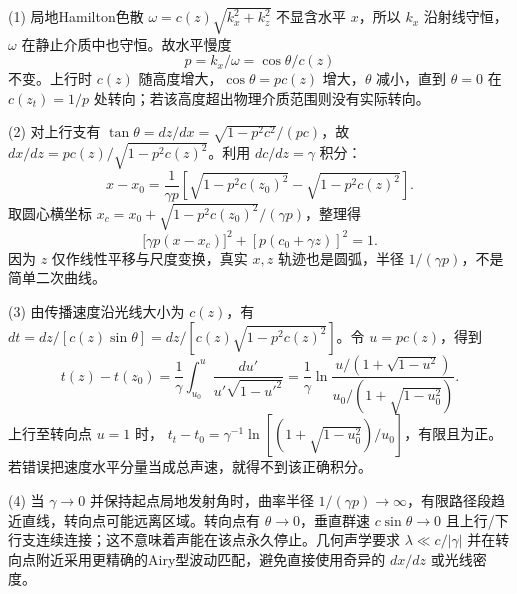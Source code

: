 (1) 局地Hamilton色散 \(\omega=c(z)\sqrt{k_x^2+k_z^2}\) 不显含水平 \(x\)，所以 \(k_x\) 沿射线守恒，\(\omega\) 在静止介质中也守恒。故水平慢度
\[
\boxed{p=k_x/\omega=\cos\theta/c(z)}
\]
不变。上行时 \(c(z)\) 随高度增大，\(\cos\theta=pc(z)\) 增大，\(\theta\) 减小，直到 \(\theta=0\) 在 \(c(z_t)=1/p\) 处转向；若该高度超出物理介质范围则没有实际转向。

(2) 对上行支有 \(\tan\theta=dz/dx=\sqrt{1-p^2c^2}/(pc)\)，故
\(dx/dz=pc(z)/\sqrt{1-p^2c(z)^2}\)。利用 \(dc/dz=\gamma\) 积分：
\[
x-x_0=\frac1{\gamma p}\left[\sqrt{1-p^2c(z_0)^2}-\sqrt{1-p^2c(z)^2}\right].
\]
取圆心横坐标 \(x_c=x_0+\sqrt{1-p^2c(z_0)^2}/(\gamma p)\)，整理得
\[
\boxed{\bigl[\gamma p(x-x_c)\bigr]^2+[p(c_0+\gamma z)]^2=1}.
\]
因为 \(z\) 仅作线性平移与尺度变换，真实 \(x,z\) 轨迹也是圆弧，半径 \(1/(\gamma p)\)，不是简单二次曲线。

(3) 由传播速度沿光线大小为 \(c(z)\)，有 \(dt=dz/[c(z)\sin\theta]=dz/[c(z)\sqrt{1-p^2c(z)^2}]\)。令 \(u=pc(z)\)，得到
\[
t(z)-t(z_0)=\frac1\gamma\int_{u_0}^{u}\frac{du'}{u'\sqrt{1-u'^2}}
=\frac1\gamma\ln\frac{u/(1+\sqrt{1-u^2})}{u_0/(1+\sqrt{1-u_0^2})}.
\]
上行至转向点 \(u=1\) 时，
\(\boxed{t_t-t_0=\gamma^{-1}\ln[(1+\sqrt{1-u_0^2})/u_0]}\)，有限且为正。若错误把速度水平分量当成总声速，就得不到该正确积分。

(4) 当 \(\gamma\to0\) 并保持起点局地发射角时，曲率半径 \(1/(\gamma p)\to\infty\)，有限路径段趋近直线，转向点可能远离区域。转向点有 \(\theta\to0\)，垂直群速 \(c\sin\theta\to0\) 且上行/下行支连续连接；这不意味着声能在该点永久停止。几何声学要求 \(\lambda\ll c/|\gamma|\) 并在转向点附近采用更精确的Airy型波动匹配，避免直接使用奇异的 \(dx/dz\) 或光线密度。
